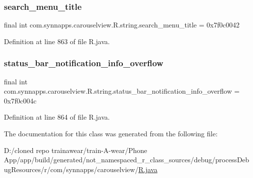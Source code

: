 \subsubsection{\texorpdfstring{search\_menu\_title}{search\_menu\_title}}
{\footnotesize\ttfamily final int com.\+synnapps.\+carouselview.\+R.\+string.\+search\+\_\+menu\+\_\+title = 0x7f0c0042\hspace{0.3cm}{\ttfamily [static]}}



Definition at line 863 of file R.\+java.

\mbox{\label{classcom_1_1synnapps_1_1carouselview_1_1_r_1_1string_ad6cc2b4f545e49faec2778f35174e913}} 
\subsubsection{\texorpdfstring{status\_bar\_notification\_info\_overflow}{status\_bar\_notification\_info\_overflow}}
{\footnotesize\ttfamily final int com.\+synnapps.\+carouselview.\+R.\+string.\+status\+\_\+bar\+\_\+notification\+\_\+info\+\_\+overflow = 0x7f0c004c\hspace{0.3cm}{\ttfamily [static]}}



Definition at line 864 of file R.\+java.



The documentation for this class was generated from the following file\+:\begin{DoxyCompactItemize}
\item 
D\+:/cloned repo trainawear/train-\/\+A-\/wear/\+Phone App/app/build/generated/not\+\_\+namespaced\+\_\+r\+\_\+class\+\_\+sources/debug/process\+Debug\+Resources/r/com/synnapps/carouselview/\mbox{\hyperlink{process_debug_resources_2r_2com_2synnapps_2carouselview_2_r_8java}{R.\+java}}\end{DoxyCompactItemize}
